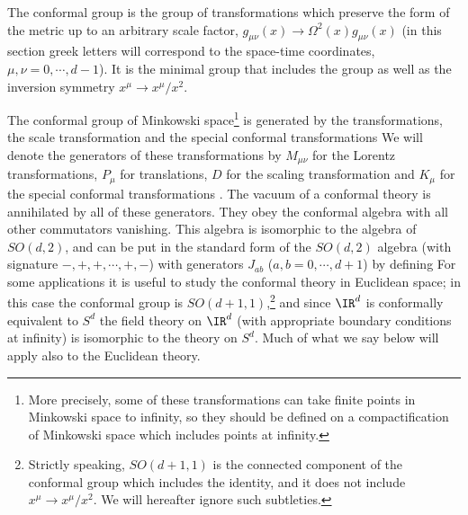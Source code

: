 The conformal group is the group of transformations which preserve the
form of the metric up to an arbitrary scale factor, $g_{\mu
\nu}(x) \to \Omega^2(x) g_{\mu \nu}(x)$ (in this section greek letters
will correspond to the space-time coordinates,
$\mu,\nu=0,\cdots,d-1$). It is the minimal group that includes the
\Poincare group as well as the inversion symmetry $x^\mu \to x^\mu /
x^2$.

The conformal group of Minkowski space\footnote{More precisely, some of
these transformations can take finite points in Minkowski space to
infinity, so they should be defined on a compactification of Minkowski
space which includes points at infinity.} is generated by the
\Poincare transformations, the scale transformation
and the special conformal transformations
We will denote the generators of these transformations by $M_{\mu
\nu}$ for the Lorentz transformations, $P_\mu$ for translations, $D$
for the scaling transformation  and $K_\mu$ for the
special conformal transformations . The vacuum of a
conformal theory is annihilated by all of these generators.
They obey the conformal algebra
with all other commutators vanishing.
This algebra is isomorphic to the algebra of $SO(d,2)$, and can be put
in the standard form of the $SO(d,2)$ algebra (with signature
$-,+,+,\cdots,+,-$) with generators $J_{ab}$ ($a,b=0,\cdots,d+1$)
by defining
For some applications it is useful to study the conformal theory in
Euclidean space; in this case the conformal group is 
$SO(d+1,1)$,\footnote{Strictly speaking, $SO(d+1,1)$ is the connected 
component of the conformal group which includes the identity, and it does 
not include $x^\mu \to x^\mu / x^2$.  We will hereafter ignore such 
subtleties.}
 and
since $\IR^d$ is conformally equivalent to $S^d$ the field theory on
$\IR^d$ (with appropriate boundary conditions at infinity) is isomorphic
to the theory on $S^d$. Much of what we say below will apply also to
the Euclidean theory.

